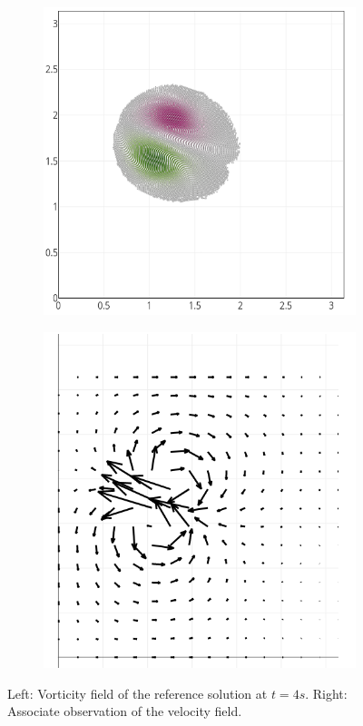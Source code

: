 \documentclass[a4paper,10pt,oneside]{article}
\begin{document}
\begin{figure}[h]
  \centering
  \begin{subfigure}{0.35\textwidth}
    \includegraphics[width=\textwidth]{field}
  \end{subfigure}
  \hspace{1cm}
  \begin{subfigure}{0.35\textwidth}
    \includegraphics[width=1.02\textwidth]{velocity_2.00}
  \end{subfigure}
  \caption{\small Left: Vorticity field of the reference solution at $t = 4s$. Right: Associate observation of the velocity field.}
  \label{fig:vortex}
\end{figure}
\end{document}
